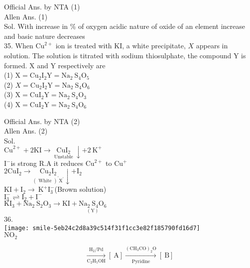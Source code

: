 \documentclass[10pt]{article}
\begin{document}
Official Ans. by NTA (1)\\
Allen Ans. (1)\\
Sol. With increase in \% of oxygen acidic nature of oxide of an element increase and basic nature decreases\\
35. When \(\mathrm{Cu}^{2+}\) ion is treated with KI, a white precipitate, \(X\) appears in solution. The solution is titrated with sodium thiosulphate, the compound Y is formed. X and Y respectively are\\
(1) \(\mathrm{X}=\mathrm{Cu}_{2} \mathrm{I}_{2} \mathrm{Y}=\mathrm{Na}_{2} \mathrm{~S}_{4} \mathrm{O}_{5}\)\\
(2) \(X=\mathrm{Cu}_{2} \mathrm{I}_{2} \mathrm{Y}=\mathrm{Na}_{2} \mathrm{~S}_{4} \mathrm{O}_{6}\)\\
(3) \(\mathrm{X}=\mathrm{CuI}_{2} \mathrm{Y}=\mathrm{Na}_{2} \mathrm{~S}_{4} \mathrm{O}_{3}\)\\
(4) \(\mathrm{X}=\mathrm{CuI}_{2} \mathrm{Y}=\mathrm{Na}_{2} \mathrm{~S}_{4} \mathrm{O}_{6}\)

Official Ans. by NTA (2)\\
Allen Ans. (2)\\
Sol.\\
\(\mathrm{Cu}^{2+}+2 \mathrm{KI} \longrightarrow \underset{\text { Unstable }}{\mathrm{CuI}_{2}} \downarrow+2 \mathrm{~K}^{+}\)\\
\(\mathrm{I}^{-}\)is strong R.A it reduces \(\mathrm{Cu}^{2+}\) to \(\mathrm{Cu}^{+}\)\\
\(2 \mathrm{CuI}_{2} \longrightarrow \underset{(\text { White })^{\prime} \mathrm{X}^{\prime}}{\mathrm{Cu}_{2} \mathrm{I}_{2}} \downarrow+\mathrm{I}_{2}\)\\
\(\mathrm{KI}+\mathrm{I}_{2} \longrightarrow \mathrm{~K}^{+} \mathrm{I}_{3}^{-}\)(Brown solution)\\
\(\mathrm{I}_{3}^{-} \rightleftharpoons \mathrm{I}_{2}+\mathrm{I}^{-}\)\\
\(\mathrm{KI}_{3}+\mathrm{Na}_{2} \mathrm{~S}_{2} \mathrm{O}_{3} \rightarrow \mathrm{KI}+\underset{(\mathrm{Y})}{\mathrm{Na}_{2} \mathrm{~S}_{4} \mathrm{O}_{6}}\)\\
36.\\
\texttt{[image: smile-5eb24c2d8a39c514f31f1cc3e82f185790fd16d7]}\\
\(\mathrm{NO}_{2}\)

\[
\xrightarrow[\mathrm{C}_{2} \mathrm{H}_{5} \mathrm{OH}]{\mathrm{H}_{2} / \mathrm{Pd}}[\mathrm{~A}] \xrightarrow[\text { Pyridine }]{\left(\mathrm{CH}_{3} \mathrm{CO}\right)_{2} \mathrm{O}}[\mathrm{~B}]
\]
\end{document}
